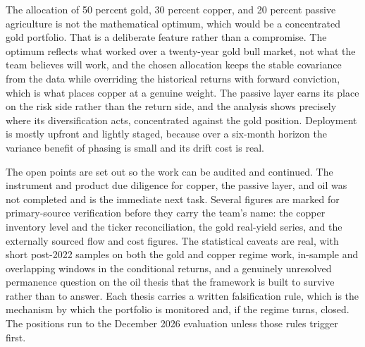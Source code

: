 \documentclass[11pt,a4paper]{article}
\begin{document}
The allocation of 50 percent gold, 30 percent copper, and 20 percent passive agriculture is not the mathematical optimum, which would be a concentrated gold portfolio. That is a deliberate feature rather than a compromise. The optimum reflects what worked over a twenty-year gold bull market, not what the team believes will work, and the chosen allocation keeps the stable covariance from the data while overriding the historical returns with forward conviction, which is what places copper at a genuine weight. The passive layer earns its place on the risk side rather than the return side, and the analysis shows precisely where its diversification acts, concentrated against the gold position. Deployment is mostly upfront and lightly staged, because over a six-month horizon the variance benefit of phasing is small and its drift cost is real.

The open points are set out so the work can be audited and continued. The instrument and product due diligence for copper, the passive layer, and oil was not completed and is the immediate next task. Several figures are marked for primary-source verification before they carry the team's name: the copper inventory level and the ticker reconciliation, the gold real-yield series, and the externally sourced flow and cost figures. The statistical caveats are real, with short post-2022 samples on both the gold and copper regime work, in-sample and overlapping windows in the conditional returns, and a genuinely unresolved permanence question on the oil thesis that the framework is built to survive rather than to answer. Each thesis carries a written falsification rule, which is the mechanism by which the portfolio is monitored and, if the regime turns, closed. The positions run to the December 2026 evaluation unless those rules trigger first.
\end{document}
